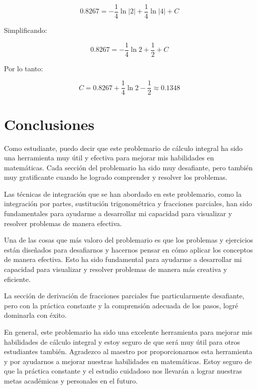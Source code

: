 \documentclass[a4paper, oneside]{report}
\begin{document}
$$0.8267 = -\frac{1}{4} \ln |2| + \frac{1}{4} \ln |4| + C $$

Simplificando:

$$0.8267 = -\frac{1}{4} \ln 2 + \frac{1}{2} + C $$

Por lo tanto:

$$C = 0.8267 + \frac{1}{4} \ln 2 - \frac{1}{2} \approx 0.1348 $$




\pagebreak

\section{Conclusiones}

Como estudiante, puedo decir que este problemario de cálculo integral ha sido una herramienta muy útil y efectiva para mejorar mis habilidades en matemáticas. Cada sección del problemario ha sido muy desafiante, pero también muy gratificante cuando he logrado comprender y resolver los problemas.

Las técnicas de integración que se han abordado en este problemario, como la integración por partes, sustitución trigonométrica y fracciones parciales, han sido fundamentales para ayudarme a desarrollar mi capacidad para visualizar y resolver problemas de manera efectiva.

Una de las cosas que más valoro del problemario es que los problemas y ejercicios están diseñados para desafiarnos y hacernos pensar en cómo aplicar los conceptos de manera efectiva. Esto ha sido fundamental para ayudarme a desarrollar mi capacidad para visualizar y resolver problemas de manera más creativa y eficiente.

La sección de derivación de fracciones parciales fue particularmente desafiante, pero con la práctica constante y la comprensión adecuada de los pasos, logré dominarla con éxito.

En general, este problemario ha sido una excelente herramienta para mejorar mis habilidades de cálculo integral y estoy seguro de que será muy útil para otros estudiantes también. Agradezco al maestro por proporcionarnos esta herramienta y por ayudarnos a mejorar nuestras habilidades en matemáticas. Estoy seguro de que la práctica constante y el estudio cuidadoso nos llevarán a lograr nuestras metas académicas y personales en el futuro.
\pagebreak
\end{document}
